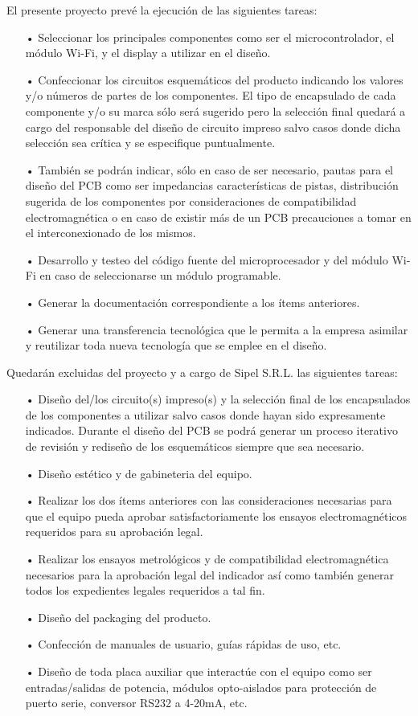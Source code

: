\documentclass[11pt]{charter}
\begin{document}
El presente proyecto prevé la ejecución de las siguientes tareas:
\begin{itemize}
\item[•]Seleccionar los principales componentes como ser el microcontrolador, el módulo Wi-Fi, y el display a utilizar en el diseño.
\item[•]Confeccionar los circuitos esquemáticos del producto indicando los valores y/o números de partes de los componentes. El tipo de encapsulado de cada componente y/o su marca sólo será sugerido pero la selección final quedará a cargo del responsable del diseño de circuito impreso salvo casos donde dicha selección sea crítica y se especifique puntualmente. 
\item[•]También se podrán indicar, sólo en caso de ser necesario, pautas para el diseño del PCB como ser impedancias características de      pistas, distribución sugerida de los componentes  por consideraciones de compatibilidad electromagnética o en caso de existir más de un PCB precauciones a tomar en el interconexionado de los mismos. 
\item[•]Desarrollo y testeo del código fuente del microprocesador y del módulo Wi-Fi en caso de seleccionarse un módulo programable. 
\item[•]Generar la documentación correspondiente a los ítems anteriores.
\item[•]Generar una transferencia tecnológica que le permita a la empresa asimilar y reutilizar toda nueva tecnología que se emplee en el diseño. 
\end{itemize}


Quedarán excluidas del proyecto y a cargo de Sipel S.R.L. las siguientes tareas:
\begin{itemize}
\item[•]Diseño del/los circuito(s) impreso(s) y la selección final de los encapsulados de los componentes a utilizar salvo casos  donde hayan sido expresamente indicados. Durante el diseño del PCB se podrá generar un proceso iterativo de      revisión y rediseño de los esquemáticos siempre que sea necesario.
\item[•]Diseño estético y de gabineteria del equipo.
\item[•]Realizar los dos ítems anteriores con las consideraciones necesarias para que el equipo pueda aprobar satisfactoriamente los ensayos electromagnéticos requeridos para su aprobación legal.
\item[•]Realizar los ensayos metrológicos y de compatibilidad electromagnética necesarios para la aprobación legal del indicador así como también generar  todos los expedientes legales requeridos a tal fin.
\item[•]Diseño del packaging del producto.
\item[•]Confección de manuales de usuario, guías rápidas de uso, etc.
\item[•]Diseño de toda placa auxiliar que interactúe con el equipo como ser entradas/salidas de potencia, módulos opto-aislados para protección de puerto serie, conversor RS232 a 4-20mA, etc.
\end{itemize}
\end{document}
